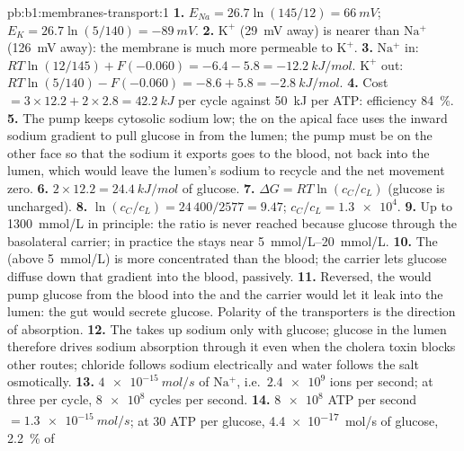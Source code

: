 \begin{solution}{pb:b1:membranes-transport:1}
\textbf{1.} $E_{Na} = 26.7\ln(145/12) = \qty{+66}{mV}$; $E_K =
26.7\ln(5/140) = \qty{-89}{mV}$.
\textbf{2.} $\mathrm{K^+}$ (\qty{29}{mV} away) is nearer than
$\mathrm{Na^+}$ (\qty{126}{mV} away): the membrane is much more
permeable to $\mathrm{K^+}$.
\textbf{3.} $\mathrm{Na^+}$ in: $RT\ln(12/145) + F(-0.060) = -6.4 -
5.8 = \qty{-12.2}{kJ/mol}$. $\mathrm{K^+}$ out: $RT\ln(5/140) -
F(-0.060) = -8.6 + 5.8 = \qty{-2.8}{kJ/mol}$.
\textbf{4.} Cost $= 3\times 12.2 + 2\times 2.8 = \qty{42.2}{kJ}$ per
cycle against \qty{50}{kJ} per ATP: efficiency \qty{84}{\%}.
\textbf{5.} The pump keeps cytosolic sodium low; the  on the
apical face uses the inward sodium gradient to pull glucose in from
the lumen; the pump must be on the other face so that the sodium it
exports goes to the blood, not back into the lumen, which would leave
the lumen's sodium to recycle and the net movement zero.
\textbf{6.} $2\times 12.2 = \qty{24.4}{kJ/mol}$ of glucose.
\textbf{7.} $\Delta G = RT\ln(c_C/c_L)$ (glucose is uncharged).
\textbf{8.} $\ln(c_C/c_L) = 24\,400/2577 = 9.47$; $c_C/c_L =
\num{1.3e4}$.
\textbf{9.} Up to \qty{1300}{mmol/L} in principle: the ratio is never
reached because glucose  through the basolateral carrier; in
practice the  stays near \qtyrange{5}{20}{mmol/L}.
\textbf{10.} The  (above \qty{5}{mmol/L}) is more concentrated
than the blood; the carrier lets glucose diffuse down that gradient
into the blood, passively.
\textbf{11.} Reversed, the  would pump glucose from the blood
into the  and the carrier would let it leak into the lumen: the
gut would secrete glucose. Polarity of the transporters is the
direction of absorption.
\textbf{12.} The  takes up sodium only with glucose; glucose
in the lumen therefore drives sodium absorption through it even when
the cholera toxin blocks other routes; chloride follows sodium
electrically and water follows the salt osmotically.
\textbf{13.} $\qty{4e-15}{mol/s}$ of $\mathrm{Na^+}$, i.e.\
$\num{2.4e9}$ ions per second; at three per cycle, $\num{8e8}$ cycles
per second.
\textbf{14.} $\num{8e8}$ ATP per second $= \qty{1.3e-15}{mol/s}$; at
30 ATP per glucose, \qty{4.4e-17}{mol/s} of glucose, \qty{2.2}{\%} of

\end{solution}
